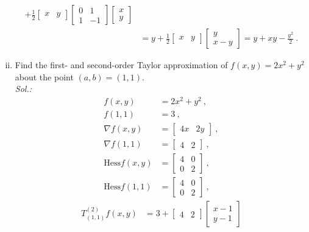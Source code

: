 \begin{example}
\begin{enumerate}[(i)]
\begin{equation*}
\begin{split}
	+ \frac{1}{2} \begin{bmatrix} x & y \end{bmatrix}
	\begin{bmatrix}	0 & 1 \\ 1 & -1	\end{bmatrix}
	\begin{bmatrix} x \\ y \end{bmatrix} \\
	& = y + \frac{1}{2} \begin{bmatrix} x & y \end{bmatrix} 
	\begin{bmatrix} y \\ x - y \end{bmatrix} 
	= y + xy - \frac{y^2}{2} \:.
	\end{split}
	\end{equation*}
	\item Find the first- and second-order Taylor approximation of $f(x,y)= 2x^2 + y^2$ about the point $(a,b)=(1,1)$. \\
	{\it Sol.:}
	\begin{equation*}
	\begin{split}
	f(x,y) & = 2x^2 + y^2 \:, \\
	f(1,1) & = 3 \:, \\
	\nabla f(x,y) & = \begin{bmatrix} 4x & 2y \end{bmatrix} \:, \\
	\nabla f(1,1) & = \begin{bmatrix} 4 & 2 \end{bmatrix} \:, \\
	\mathrm{Hess}f(x,y) & = \begin{bmatrix} 4 & 0 \\ 0 & 2 \end{bmatrix} \:, \\
	\mathrm{Hess}f(1,1) & = \begin{bmatrix} 4 & 0 \\ 0 & 2 \end{bmatrix} \:,
	\end{split}
	\end{equation*}
	\begin{equation*}
	\begin{split} 
	T^{(2)}_{(1,1)}f(x,y) & = 3 + 
	\begin{bmatrix} 4 & 2 \end{bmatrix}
	\begin{bmatrix} x-1 \\ y-1 \end{bmatrix}

\end{split}
\end{equation*}
\end{enumerate}
\end{example}
